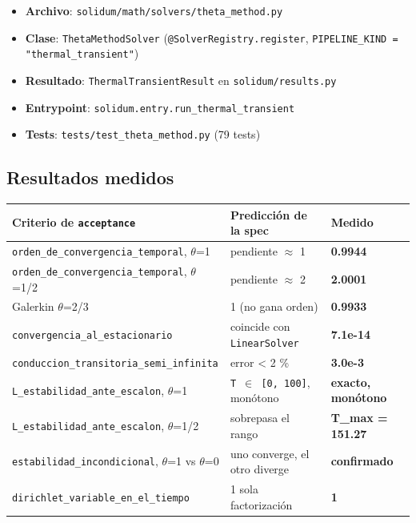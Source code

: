 \documentclass[11pt,letterpaper,oneside]{report}
\begin{document}
\begin{itemize}
  \item \textbf{Archivo}: \texttt{solidum/math/solvers/theta\_method.py}
  \item \textbf{Clase}: \texttt{ThetaMethodSolver} (\texttt{@SolverRegistry.register}, \texttt{PIPELINE\_KIND = "thermal\_transient"})
  \item \textbf{Resultado}: \texttt{ThermalTransientResult} en \texttt{solidum/results.py}
  \item \textbf{Entrypoint}: \texttt{solidum.entry.run\_thermal\_transient}
  \item \textbf{Tests}: \texttt{tests/test\_theta\_method.py} (79 tests)
\end{itemize}

\subsection{Resultados medidos}

\begin{center}
\begin{tabularx}{\textwidth}{YYY}
\hline
\textbf{Criterio de \texttt{acceptance}} & \textbf{Predicción de la spec} & \textbf{Medido} \\
\hline
\texttt{orden\_de\_convergencia\_temporal}, \ensuremath{\theta}=1 & pendiente \ensuremath{\approx} 1 & \textbf{0.9944} \\
\texttt{orden\_de\_convergencia\_temporal}, \ensuremath{\theta}=1/2 & pendiente \ensuremath{\approx} 2 & \textbf{2.0001} \\
Galerkin \ensuremath{\theta}=2/3 & 1 (no gana orden) & \textbf{0.9933} \\
\texttt{convergencia\_al\_estacionario} & coincide con \texttt{LinearSolver} & \textbf{7.1e-14} \\
\texttt{conduccion\_transitoria\_semi\_infinita} & error < 2 \% & \textbf{3.0e-3} \\
\texttt{L\_estabilidad\_ante\_escalon}, \ensuremath{\theta}=1 & \texttt{T \ensuremath{\in} [0, 100]}, monótono & \textbf{exacto, monótono} \\
\texttt{L\_estabilidad\_ante\_escalon}, \ensuremath{\theta}=1/2 & sobrepasa el rango & \textbf{T\_max = 151.27} \\
\texttt{estabilidad\_incondicional}, \ensuremath{\theta}=1 vs \ensuremath{\theta}=0 & uno converge, el otro diverge & \textbf{confirmado} \\
\texttt{dirichlet\_variable\_en\_el\_tiempo} & 1 sola factorización & \textbf{1} \\
\hline
\end{tabularx}
\end{center}
\end{document}
